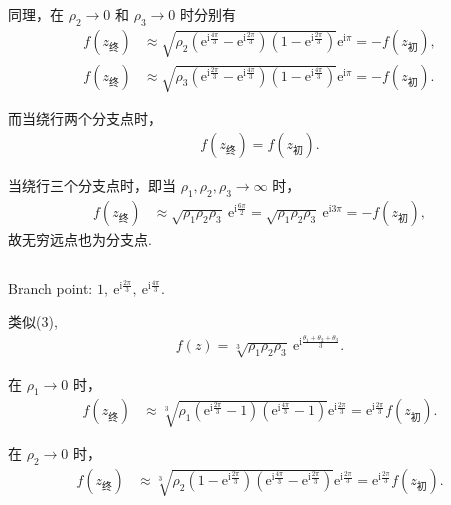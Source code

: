 \documentclass[12pt]{article}
\begin{document}
同理，在 \(\rho_2\to0\) 和 \(\rho_3\to0\) 时分别有
\begin{align*}
f(z_{\text{终}}) &\approx \sqrt{\rho_2\left(\mathrm{e}^{\mathrm{i}\frac{4\pi}{3}}-\mathrm{e}^{\mathrm{i}\frac{2\pi}{3}}\right)\left(1-\mathrm{e}^{\mathrm{i}\frac{2\pi}{3}}\right)} \mathrm{e}^{\mathrm{i}\pi} = -f(z_{\text{初}}), \\
f(z_{\text{终}}) &\approx \sqrt{\rho_3\left(\mathrm{e}^{\mathrm{i}\frac{2\pi}{3}}-\mathrm{e}^{\mathrm{i}\frac{4\pi}{3}}\right)\left(1-\mathrm{e}^{\mathrm{i}\frac{4\pi}{3}}\right)} \mathrm{e}^{\mathrm{i}\pi} = -f(z_{\text{初}}).
\end{align*}

而当绕行两个分支点时，
\begin{align*}
f(z_{\text{终}}) = f(z_{\text{初}}).
\end{align*}

当绕行三个分支点时，即当 \(\rho_1,\rho_2,\rho_3\to\infty\) 时，
\begin{align*}
f(z_{\text{终}}) &\approx \sqrt{\rho_1\rho_2\rho_3}\ \mathrm{e}^{\mathrm{i}\frac{6\pi}{2}} = \sqrt{\rho_1\rho_2\rho_3}\ \mathrm{e}^{\mathrm{i}3\pi} = -f(z_{\text{初}}),
\end{align*}
故无穷远点也为分支点.
\subsection{}
Branch point: \(1,\ \mathrm{e}^{\mathrm{i}\frac{2\pi}{3}},\ \mathrm{e}^{\mathrm{i}\frac{4\pi}{3}}\).

类似(3),
\begin{align*}
f(z) = \sqrt[3]{\rho_1\rho_2\rho_3}\ \mathrm{e}^{\mathrm{i}\frac{\theta_1+\theta_2+\theta_3}{3}}.
\end{align*}

在 \(\rho_1\to0\) 时，
\begin{align*}
f(z_{\text{终}}) &\approx \sqrt[3]{\rho_1\left(\mathrm{e}^{\mathrm{i}\frac{2\pi}{3}}-1\right)\left(\mathrm{e}^{\mathrm{i}\frac{4\pi}{3}}-1\right)} \mathrm{e}^{\mathrm{i}\frac{2\pi}{3}} = \mathrm{e}^{\mathrm{i}\frac{2\pi}{3}} f(z_{\text{初}}).
\end{align*}

在 \(\rho_2\to0\) 时，
\begin{align*}
f(z_{\text{终}}) &\approx \sqrt[3]{\rho_2\left(1-\mathrm{e}^{\mathrm{i}\frac{2\pi}{3}}\right)\left(\mathrm{e}^{\mathrm{i}\frac{4\pi}{3}}-\mathrm{e}^{\mathrm{i}\frac{2\pi}{3}}\right)} \mathrm{e}^{\mathrm{i}\frac{2\pi}{3}} = \mathrm{e}^{\mathrm{i}\frac{2\pi}{3}} f(z_{\text{初}}).
\end{align*}
\end{document}
